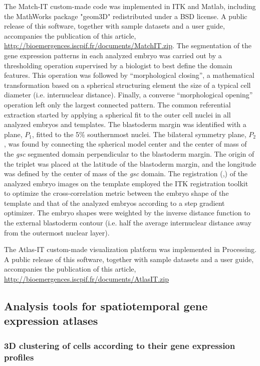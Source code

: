 The Match-IT custom-made code was implemented in ITK and Matlab, including the MathWorks package "geom3D" redistributed under a BSD license. A public release of this software, together with sample datasets and a user guide, accompanies the publication of this article,
\url{http://bioemergences.iscpif.fr/documents/MatchIT.zip}.
The segmentation of the gene expression patterns in each analyzed embryo was carried out by a thresholding operation supervised by a biologist to best define the domain features. This operation was followed by ``morphological closing''\cite{serra8288}, a mathematical transformation based on a spherical structuring element the size of a typical cell diameter (i.e. internuclear distance). Finally, a converse ``morphological opening'' operation left only the largest connected pattern.
The common referential extraction started by applying a spherical fit to the outer cell nuclei in all analyzed embryos and templates. The blastoderm margin was identified with a plane, $P_1$, fitted to the 5\% southernmost nuclei. The bilateral symmetry plane, $P_2$, was found by connecting the spherical model center and the center of mass of the \emph{gsc} segmented domain perpendicular to the blastoderm margin. The origin of the triplet was placed at the latitude of the blastoderm margin, and the longitude was defined by the center of mass of the \emph{gsc} domain.
The registration (\cite{zitova2003image},\cite{maintz1998survey}) of the analyzed embryo images on the template employed the ITK registration toolkit to optimize the cross-correlation metric between the embryo shape of the template and that of the analyzed embryos according to a step gradient optimizer. The embryo shapes were weighted by the inverse distance function to the external blastoderm contour (i.e. half the average internuclear distance away from the outermost nuclear layer).

The Atlas-IT custom-made visualization platform was implemented in Processing. A public release of this software, together with sample datasets and a user guide, accompanies the publication of this article,
\url{http://bioemergences.iscpif.fr/documents/AtlasIT.zip}

\subsection*{Analysis tools for spatiotemporal gene expression atlases}
\label{subsec:AnalyticalTools}

\subsubsection*{\textbf{3D clustering of cells according to their gene expression profiles}}

